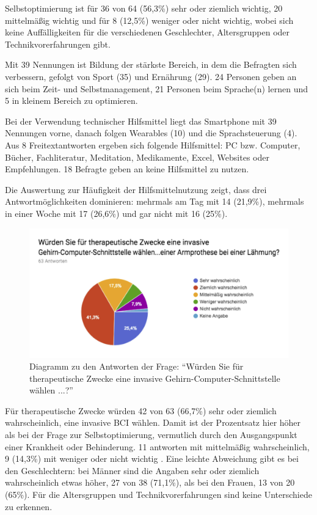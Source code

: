 \documentclass[11pt,ngerman,parskip=half]{scrartcl}
\begin{document}
Selbstoptimierung ist für 36 von 64 (56,3\%) sehr oder ziemlich wichtig, 20
mittelmäßig wichtig und für 8 (12,5\%) weniger oder nicht wichtig, wobei sich
keine Auffälligkeiten für die verschiedenen Geschlechter, Altersgruppen oder
Technikvorerfahrungen gibt.

Mit 39 Nennungen ist Bildung der stärkste Bereich, in dem die Befragten sich
verbessern, gefolgt von Sport (35) und Ernährung (29). 24 Personen geben an
sich beim Zeit- und Selbstmanagement, 21 Personen beim Sprache(n) lernen und
5 in kleinem Bereich zu optimieren.

Bei der Verwendung technischer Hilfsmittel liegt das Smartphone mit 39
Nennungen vorne, danach folgen Wearables (10) und die Sprachsteuerung (4).
Aus 8 Freitextantworten ergeben sich folgende Hilfsmittel: PC bzw. Computer,
Bücher, Fachliteratur, Meditation, Medikamente, Excel, Websites oder
Empfehlungen. 18 Befragte geben an keine Hilfsmittel zu nutzen.

Die Auswertung zur Häufigkeit der Hilfsmittelnutzung zeigt, dass drei
Antwortmöglichkeiten dominieren: mehrmals am Tag mit 14 (21,9\%), mehrmals in
einer Woche mit 17 (26,6\%) und gar nicht mit 16 (25\%).

\begin{figure}[H]
  \centering
  \includegraphics[width=1.0\textwidth]{src/img/kathrin2.png}
  \caption{Diagramm zu den Antworten der Frage: \enquote{Würden Sie für
  therapeutische Zwecke eine invasive Gehirn-Computer-Schnittstelle wählen
  ...?}}
  \label{img:kathrin2}
\end{figure}

Für therapeutische Zwecke würden 42 von 63 (66,7\%) sehr oder ziemlich
wahrscheinlich, eine invasive BCI wählen. Damit ist der Prozentsatz hier
höher als bei der Frage zur Selbstoptimierung, vermutlich durch den
Ausgangspunkt einer Krankheit oder Behinderung. 11 antworten mit mittelmäßig
wahrscheinlich, 9 (14,3\%) mit weniger oder nicht wichtig . Eine leichte
Abweichung gibt es bei den Geschlechtern: bei Männer sind die Angaben sehr
oder ziemlich wahrscheinlich etwas höher, 27 von 38 (71,1\%), als bei den
Frauen, 13 von 20 (65\%). Für die Altersgruppen und Technikvorerfahrungen sind
keine Unterschiede zu erkennen.
\end{document}
